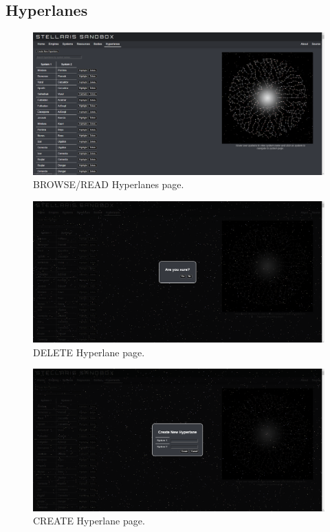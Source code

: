 \documentclass[12pt]{article}
\let\Oldsubsection\subsection
\renewcommand{\subsection}{\FloatBarrier\Oldsubsection}
\begin{document}
\newpage
\subsection{Hyperlanes}

\begin{figure}[!ht]
  \caption{BROWSE/READ Hyperlanes page.}
  \includegraphics[width=\textwidth]{screenshots/hyperlanes/hyperlanes_browse_read.png}
\end{figure}

\begin{figure}[!ht]
  \caption{DELETE Hyperlane page.}
  \includegraphics[width=\textwidth]{screenshots/hyperlanes/hyperlanes_delete.png}
\end{figure}

\begin{figure}[!ht]
  \caption{CREATE Hyperlane page.}
  \includegraphics[width=\textwidth]{screenshots/hyperlanes/hyperlanes_create.png}
\end{figure}
\end{document}
